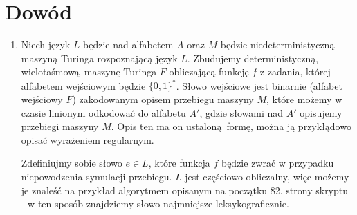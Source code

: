 \documentclass[a4paper]{article}
\newcommand{\set}[1]{\{#1\}}%
\begin{document}
\section*{Dowód}
  \begin{enumerate}
  \item 
  Niech język $L$ będzie nad alfabetem $A$ oraz $M$ będzie niedeterministyczną maszyną Turinga rozpoznającą język $L$. Zbudujemy deterministyczną, wielotaśmową maszynę Turinga $F$ obliczającą funkcję $f$ z zadania, której alfabetem wejściowym będzie $\set{0, 1}^{*}$. Słowo wejściowe jest binarnie (alfabet wejściowy $F$) zakodowanym opisem przebiegu maszyny $M$, które możemy w czasie linionym odkodować do alfabetu $A'$, gdzie słowami nad $A'$ opisujemy przebiegi maszyny $M$. Opis ten ma on ustaloną formę, można ją przykłądowo opisać wyrażeniem regularnym.

  Zdefiniujmy sobie słowo $e \in L$, które funkcja $f$ będzie zwrać w przypadku niepowodzenia symulacji przebiegu. $L$ jest częściowo obliczalny, więc możemy je znaleść na przykład algorytmem opisanym na początku 82. strony skryptu - w ten sposób znajdziemy słowo najmniejsze leksykograficznie.


\end{enumerate}
\end{document}
